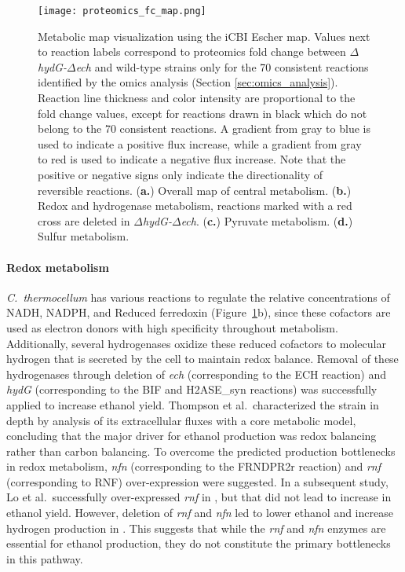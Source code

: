 \begin{figure}[p]
    \centering
    \texttt{[image: proteomics\_fc\_map.png]}
    \caption[Metabolic map visualization of proteomics data]{Metabolic map visualization using the iCBI Escher map. Values next to reaction labels correspond to proteomics fold change between \textit{$\Delta$hydG-$\Delta$ech} and wild-type strains only for the 70 consistent reactions identified by the omics analysis (Section \ref{sec:omics_analysis}). Reaction line thickness and color intensity are proportional to the fold change values, except for reactions drawn in black which do not belong to the 70 consistent reactions. A gradient from gray to blue is used to indicate a positive flux increase, while a gradient from gray to red is used to indicate a negative flux increase. Note that the positive or negative signs only indicate the directionality of reversible reactions. (\textbf{a.}) Overall map of central metabolism. (\textbf{b.}) Redox and hydrogenase metabolism, reactions marked with a red cross are deleted in \textit{$\Delta$hydG-$\Delta$ech}. (\textbf{c.}) Pyruvate metabolism. (\textbf{d.}) Sulfur metabolism.}
    \label{fig6:map}
\end{figure}

\paragraph{Redox metabolism}
\textit{C.~thermocellum} has various reactions to regulate the relative concentrations of NADH, NADPH, and Reduced ferredoxin (Figure~\ref{fig6:map}b), since these cofactors are used as electron donors with high specificity throughout metabolism. Additionally, several hydrogenases oxidize these reduced cofactors to molecular hydrogen that is secreted by the cell to maintain redox balance. Removal of these hydrogenases through deletion of \textit{ech} (corresponding to the ECH reaction) and \textit{hydG} (corresponding to the BIF and H2ASE\_syn reactions) was successfully applied to increase ethanol yield.\citep{biswas2015}
Thompson et al.\citep{thompson2015}\ characterized the  strain in depth by analysis of its extracellular fluxes with a core metabolic model, concluding that the major driver for ethanol production was redox balancing rather than carbon balancing. To overcome the predicted production bottlenecks in redox metabolism, \textit{nfn} (corresponding to the  FRNDPR2r reaction) and \textit{rnf} (corresponding to RNF) over-expression were suggested.
In a subsequent study, Lo et al.\citep{lo2017}\ successfully over-expressed \textit{rnf} in , but that did not lead to increase in ethanol yield. However, deletion of \textit{rnf} and \textit{nfn} led to lower ethanol and increase hydrogen production in . This suggests that while the \textit{rnf} and \textit{nfn} enzymes are essential for ethanol production, they do not constitute the primary bottlenecks in this pathway.

